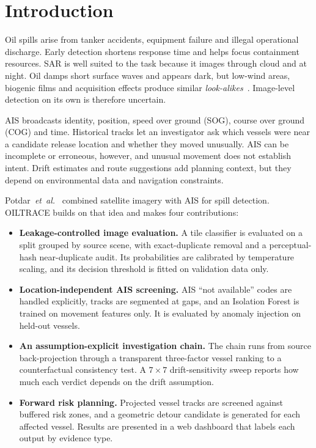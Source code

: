 \documentclass[conference]{IEEEtran}
\begin{document}
\section{Introduction}

Oil spills arise from tanker accidents, equipment failure and illegal operational
discharge. Early detection shortens response time and helps focus containment
resources. SAR is well suited to the task because it images through cloud and at
night. Oil damps short surface waves and appears dark, but low-wind areas, biogenic
films and acquisition effects produce similar \emph{look-alikes}~\cite{brekke2005}.
Image-level detection on its own is therefore uncertain.

AIS broadcasts identity, position, speed over ground (SOG), course over ground (COG)
and time. Historical tracks let an investigator ask which vessels were near a
candidate release location and whether they moved unusually. AIS can be incomplete
or erroneous, however, and unusual movement does not establish intent. Drift estimates
and route suggestions add planning context, but they depend on environmental data and
navigation constraints.

Potdar~\emph{et~al.}~\cite{potdar2025} combined satellite imagery with AIS for spill
detection. OILTRACE builds on that idea and makes four contributions:
\begin{itemize}
  \item \textbf{Leakage-controlled image evaluation.} A tile classifier is evaluated
  on a split grouped by source scene, with exact-duplicate removal and a
  perceptual-hash near-duplicate audit. Its probabilities are calibrated by temperature
  scaling, and its decision threshold is fitted on validation data only.
  \item \textbf{Location-independent AIS screening.} AIS ``not available'' codes are
  handled explicitly, tracks are segmented at gaps, and an Isolation Forest is trained
  on movement features only. It is evaluated by anomaly injection on held-out vessels.
  \item \textbf{An assumption-explicit investigation chain.} The chain runs from source
  back-projection through a transparent three-factor vessel ranking to a counterfactual
  consistency test. A $7\times7$ drift-sensitivity sweep reports how much each verdict
  depends on the drift assumption.
  \item \textbf{Forward risk planning.} Projected vessel tracks are screened against
  buffered risk zones, and a geometric detour candidate is generated for each affected
  vessel. Results are presented in a web dashboard that labels each output by evidence
  type.
\end{itemize}
\end{document}
